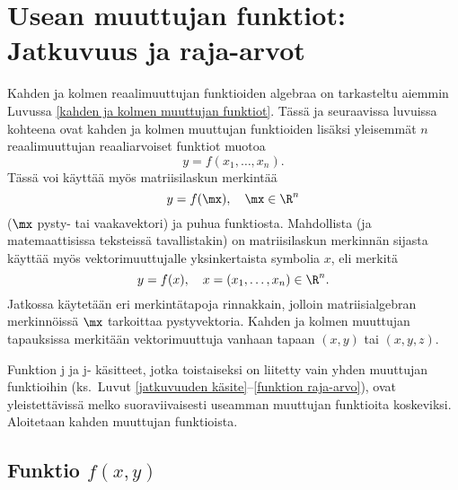 \section{Usean muuttujan funktiot: Jatkuvuus ja raja-arvot} 
\label{usean muuttujan jatkuvuus}
\alku
{}

Kahden ja kolmen reaalimuuttujan funktioiden algebraa on tarkasteltu aiemmin Luvussa 
\ref{kahden ja kolmen muuttujan funktiot}. Tässä ja seuraavissa luvuissa kohteena ovat kahden
ja kolmen muuttujan funktioiden lisäksi yleisemmät $n$ reaalimuuttujan reaaliarvoiset funktiot 
muotoa
\[
y=f(x_1,\ldots,x_n).
\]
Tässä voi käyttää myös matriisilaskun merkintää
\[
y=f(\mx), \quad \mx\in\R^n
\] 
($\mx$ pysty- tai vaakavektori) ja puhua  funktiosta. Mahdollista
(ja matemaattisissa teksteissä  tavallistakin) on matriisilaskun merkinnän sijasta käyttää myös
vektorimuuttujalle yksinkertaista symbolia $x$, eli merkitä
\[
y=f(x),\quad x=(x_1,\ldots,x_n)\in\R^n.
\]
Jatkossa käytetään eri merkintätapoja rinnakkain, jolloin matriisialgebran merkinnöissä $\mx$ 
tarkoittaa pystyvektoria. Kahden ja kolmen muuttujan tapauksissa merkitään vektorimuuttuja
vanhaan tapaan $(x,y)$ tai $(x,y,z)$. 

Funktion j ja j- käsitteet, jotka toistaiseksi
on liitetty vain yhden muuttujan funktioihin 
(ks.\ Luvut \ref{jatkuvuuden käsite}--\ref{funktion raja-arvo}), ovat yleistettävissä melko
suoraviivaisesti useamman muuttujan funktioita koskeviksi. Aloitetaan kahden muuttujan
funktioista.

\subsection*{Funktio $f(x,y)$}


